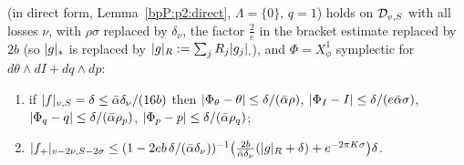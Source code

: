 \begin{lemma}\label{bpP:p2:osc-iter}
 (in direct form, Lemma~\ref{bpP:p2:direct}, $\Lambda=\{0\}$, $q=1$) holds on $\mathcal D_{v,S}$ with all losses $\nu$, with $\rho\sigma$ replaced by $\delta_\nu$, the factor $\frac2e$ in the bracket estimate replaced by $2b$ (so $\lvert g\rvert_*$ is replaced by $\lvert g\rvert_R:=\sum_jR_j\lvert g_j\rvert_{,}$), and $\Phi=X^1_\phi$ symplectic for $d\theta\wedge dI+dq\wedge dp$:
\begin{enumerate}[label=(\alph*)]
\item if $\lvert f\rvert_{v,S}=\delta\le\bar\alpha\delta_\nu/(16b)$ then $\lvert \Phi_\theta-\theta\rvert\le\delta/(\bar\alpha\rho)$, $\lvert \Phi_I-I\rvert\le\delta/(e\bar\alpha\sigma)$, $\lvert \Phi_q-q\rvert\le\delta/(\bar\alpha\rho_p)$, $\lvert \Phi_p-p\rvert\le\delta/(\bar\alpha\rho_q)$;
\item $\lvert f_+\rvert_{v-2\nu,S-2\sigma}\le(1-2eb\,\delta/(\bar\alpha\delta_\nu))^{-1}\bigl(\frac{2b}{\bar\alpha\delta_\nu}(\lvert g\rvert_R+\delta)+e^{-2\pi K\sigma}\bigr)\delta$.
\end{enumerate}
\end{lemma}

